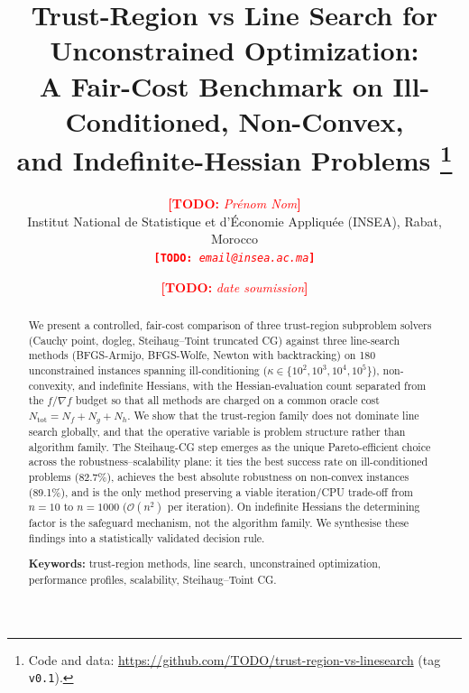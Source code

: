 \documentclass[11pt,a4paper]{article}
\newcommand{\TODO}[1]{\textcolor{red}{\textbf{[TODO:} \textit{#1}\textbf{]}}}
\newcommand{\Ntot}{N_{\mathrm{tot}}}
\newcommand{\SteihaugCG}{Steihaug-CG\xspace}
\begin{document}

\title{%
  Trust-Region vs Line Search for Unconstrained Optimization:\\
  A Fair-Cost Benchmark on Ill-Conditioned, Non-Convex,\\
  and Indefinite-Hessian Problems%
  \thanks{Code and data: \url{https://github.com/TODO/trust-region-vs-linesearch}
          (tag \texttt{v0.1}).}}

\author{%
  \TODO{Prénom Nom}\\
  Institut National de Statistique et d'Économie Appliquée (INSEA),
  Rabat, Morocco\\
  \texttt{\TODO{email@insea.ac.ma}}}

\date{\TODO{date soumission}}
\maketitle

\begin{abstract}
We present a controlled, fair-cost comparison of three trust-region
subproblem solvers (Cauchy point, dogleg, Steihaug--Toint truncated CG)
against three line-search methods (BFGS-Armijo, BFGS-Wolfe, Newton with
backtracking) on 180 unconstrained instances spanning ill-conditioning
($\kappa \in \{10^2, 10^3, 10^4, 10^5\}$), non-convexity, and indefinite
Hessians, with the Hessian-evaluation count separated from the $f/\nabla
f$ budget so that all methods are charged on a common oracle cost
$\Ntot = N_f + N_g + N_h$.
We show that the trust-region family does not dominate line search
globally, and that the operative variable is problem structure rather than
algorithm family.
The \SteihaugCG step emerges as the unique Pareto-efficient choice across
the robustness--scalability plane: it ties the best success rate on
ill-conditioned problems (82.7\%), achieves the best absolute robustness
on non-convex instances (89.1\%), and is the only method preserving a
viable iteration/CPU trade-off from $n=10$ to $n=1000$
($\mathcal{O}(n^2)$ per iteration).
On indefinite Hessians the determining factor is the safeguard mechanism,
not the algorithm family.
We synthesise these findings into a statistically validated decision rule.

\medskip
\noindent\textbf{Keywords:} trust-region methods, line search, unconstrained
optimization, performance profiles, scalability, Steihaug--Toint CG.
\end{abstract}
\end{document}
